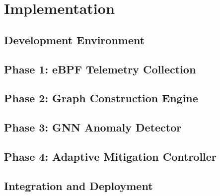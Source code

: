 
\chapter{Implementation}
\label{ch:implementation}


\section{Development Environment}
\section{Phase 1: eBPF Telemetry Collection}
\section{Phase 2: Graph Construction Engine}
\section{Phase 3: GNN Anomaly Detector}
\section{Phase 4: Adaptive Mitigation Controller}
\section{Integration and Deployment}
